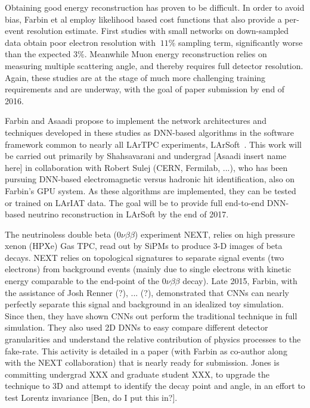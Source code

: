 Obtaining good energy reconstruction has proven to be difficult. In
order to avoid bias, Farbin et al employ likelihood based cost
functions that also provide a per-event resolution estimate. First
studies with small networks on down-sampled data obtain poor electron
resolution with $~11\%$ sampling term, significantly worse than the
expected $3\%$. Meanwhile Muon energy reconstruction relies on
measuring multiple scattering angle, and thereby requires full
detector resolution. Again, these studies are at the stage of much
more challenging training requirements and are underway, with the goal
of paper submission by end of 2016.

Farbin and Asaadi propose to implement the network architectures and
techniques developed in these studies as DNN-based algorithms in the
software framework common to nearly all LArTPC experiments,
LArSoft~\cite{}. This work will be carried out primarily by
Shahsavarani and undergrad [Asaadi insert name here] in collaboration
with Robert Sulej (CERN, Fermilab, ...), who has been pursuing
DNN-based electromagnetic versus hadronic hit identification, also on
Farbin's GPU system. As these algorithms are implemented, they can be
tested or trained on LArIAT data. The goal will be to provide full
end-to-end DNN-based neutrino reconstruction in LArSoft by the end of
2017. 



The neutrinoless double beta ($0\nu\beta\beta$) experiment NEXT,
relies on high pressure xenon (HPXe) Gas TPC, read out by SiPMs to
produce 3-D images of beta decays. NEXT relies on topological
signatures to separate signal events (two electrons) from background
events (mainly due to single electrons with kinetic energy comparable
to the end-point of the $0\nu\beta\beta$ decay). Late 2015, Farbin,
with the assistance of Josh Renner (?), ... (?), demonstrated that
CNNs can nearly perfectly separate this signal and background in an
idealized toy simulation. Since then, they have shown CNNs out perform the
traditional technique in full simulation. They also used 2D DNNs to
easy compare different detector granularities and understand the
relative contribution of physics processes to the fake-rate. This
activity is detailed in a paper (with Farbin as co-author along with
the NEXT collaboration) that is nearly ready for submission. Jones is
committing undergrad XXX and graduate student XXX, to upgrade the
technique to 3D and attempt to identify the decay point and angle, in
an effort to test Lorentz invariance [Ben, do I put this in?].

